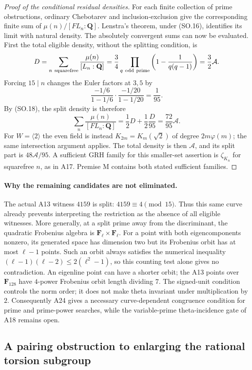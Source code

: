\documentclass[11pt,a4paper]{article}
\begin{document}
\begin{proof}[Proof of the conditional residual densities]
For each finite collection of prime obstructions, ordinary
Chebotarev and inclusion-exclusion give the corresponding
finite sum of $\mu(n)/[FL_n:\mathbf Q]$.  Lenstra's theorem,
under (SO.16), identifies its limit with natural density.
The absolutely convergent sums can now be evaluated.  First
the total eligible density, without the splitting condition, is
\[
 D=\sum_{n\ {\rm squarefree}}\frac{\mu(n)}{[L_n:\mathbf Q]}
   =\frac34\prod_{q\ {\rm odd\ prime}}
                     \left(1-\frac1{q(q-1)}\right)
   =\frac32\mathcal A.
\]
Forcing $15\mid n$ changes the Euler factors at $3,5$ by
\[
 \frac{-1/6}{1-1/6}\cdot\frac{-1/20}{1-1/20}
                            =\frac1{95}.
\]
By (SO.18), the split density is therefore
\[
 \sum_n\frac{\mu(n)}{[FL_n:\mathbf Q]}
       =\frac12D+\frac12\frac{D}{95}
       =\frac{72}{95}\mathcal A.
\]
For $W=\langle2\rangle$ the even field is instead
$K_{2m}=K_m(\sqrt2)$ of degree $2m\varphi(m)$; the same
intersection argument applies.  The total density is then
$\mathcal A$, and its split part is $48\mathcal A/95$.
A sufficient GRH family for this smaller-set assertion is
$\zeta_{K_n}$ for squarefree $n$, as in A17.  Premise M
contains both stated sufficient families.
\end{proof}

\paragraph{Why the remaining candidates are not eliminated.}
The actual A13 witness $4159$ is split: $4159\equiv4\pmod{15}$.
Thus this same curve already prevents interpreting the
restriction as the absence of all eligible witnesses.
More generally, at a split prime away from the discriminant,
the quadratic Frobenius algebra is
$\mathbf F_\ell\times\mathbf F_\ell$.  For a point with
both eigencomponents nonzero, its generated space has dimension
two but its Frobenius orbit has at most $\ell-1$ points.
Such an orbit always satisfies the numerical inequality
$(\ell-1)(\ell-2)\le2(\ell^2-1)$, so this counting test
alone gives no contradiction.  An eigenline point can have a
shorter orbit; the A13 points over $\mathbf F_{128}$ have
$4$-power Frobenius orbit length dividing $7$.
The signed-unit condition controls the norm order; it does not
make theta invariant under multiplication by $2$.
Consequently A24 gives a necessary curve-dependent congruence
condition for prime and prime-power searches, while the
variable-prime theta-incidence gate of A18 remains open.


\subsection{A pairing obstruction to enlarging the rational torsion subgroup}
\label{sec:lang-pairing-rank-bound}
\end{document}
